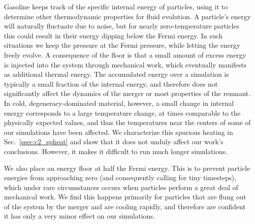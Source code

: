 Gasoline keeps track of the specific internal energy of particles, using it to determine other thermodynamic properties for fluid evolution.  A particle's energy will naturally fluctuate due to noise, but for nearly zero-temperature particles this could result in their energy dipping below the Fermi energy.  In such situations we keep the pressure at the Fermi pressure, while letting the energy freely evolve.  A consequence of the floor is that a small amount of excess energy is injected into the system through mechanical work, which eventually manifests as additional thermal energy.  The accumulated energy over a simulation is typically a small fraction of the internal energy, and therefore does not significantly affect the dynamics of the merger or most properties of the remnant.  In cold, degeneracy-dominated material, however, a small change in internal energy corresponds to a large temperature change, at times comparable to the physically expected values, and thus the temperatures near the centers of some of our simulations have been affected.  We characterize this spurious heating in Sec.~\ref{ssec:c2_spheat} and show that it does not unduly affect our work's conclusions.  However, it makes it difficult to run much longer simulations.

We also place an energy floor at half the Fermi energy.  This is to prevent particle energies from approaching zero (and consequently calling for tiny timesteps), which under rare circumstances occurs when particles perform a great deal of mechanical work.  We find this happens primarily for particles that are flung out of the system by the merger and are cooling rapidly, and therefore are confident it has only a very minor effect on our simulations.



